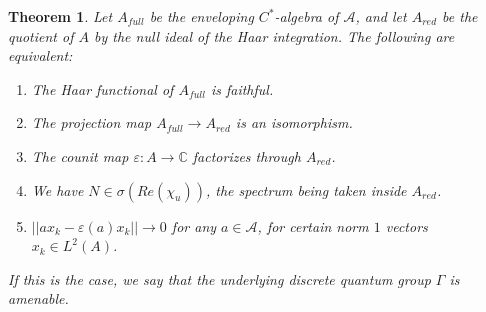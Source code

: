 \documentclass[12pt]{amsbook}
\newtheorem{theorem}{Theorem}[chapter]
\begin{document}

\begin{theorem}
Let $A_{full}$ be the enveloping $C^*$-algebra of $\mathcal A$, and let $A_{red}$ be the quotient of $A$ by the null ideal of the Haar integration. The following are equivalent:
\begin{enumerate}
\item The Haar functional of $A_{full}$ is faithful.

\item The projection map $A_{full}\to A_{red}$ is an isomorphism.

\item The counit map $\varepsilon:A\to\mathbb C$ factorizes through $A_{red}$.

\item We have $N\in\sigma(Re(\chi_u))$, the spectrum being taken inside $A_{red}$.

\item $||ax_k-\varepsilon(a)x_k||\to0$ for any $a\in\mathcal A$, for certain norm $1$ vectors $x_k\in L^2(A)$.
\end{enumerate}
If this is the case, we say that the underlying discrete quantum group $\Gamma$ is amenable.
\end{theorem}
\end{document}
